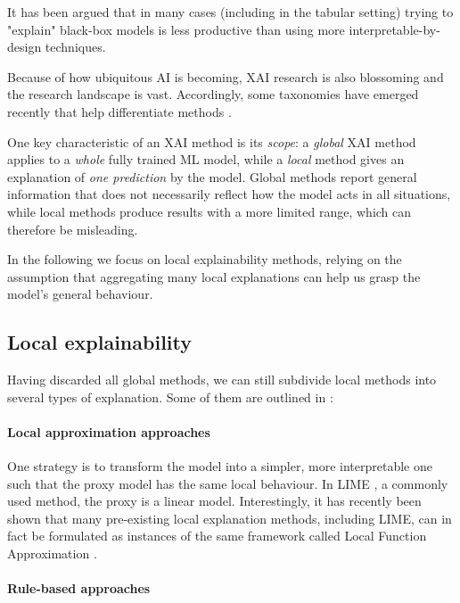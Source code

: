 \documentclass[../main.tex]{subfiles}
\begin{document}
It has been argued \cite{rudinWhy2019} that in many cases (including in the tabular setting) trying to "explain" black-box models is less productive than using more interpretable-by-design techniques.

Because of how ubiquitous AI is becoming, XAI research is also blossoming and the research landscape is vast.
Accordingly, some taxonomies have emerged recently that help differentiate methods \cite{zhangSurvey2021, bellePrinciples2021}.

One key characteristic of an XAI method is its \emph{scope}: a \emph{global} XAI method applies to a \emph{whole} fully trained ML model, while a \emph{local} method gives an explanation of \emph{one prediction} by the model.
Global methods report general information that does not necessarily reflect
how the model acts in all situations, while local methods produce results with
a more limited range, which can therefore be misleading.


In the following we focus on local explainability methods, relying on the assumption that aggregating many local explanations can help us grasp the model's general behaviour.

\subsection{Local explainability}

Having discarded all global methods, we can still subdivide local methods into several types of explanation. Some of them are outlined in \cite{bellePrinciples2021}:

\paragraph{Local approximation approaches}

One strategy is to transform the model into a simpler, more interpretable one such that the proxy model has the same local behaviour. In LIME \cite{ribeiroWhy2016}, a commonly used method, the proxy is a linear model.
Interestingly, it has recently been shown that many pre-existing local explanation methods, including LIME, can in fact be formulated as instances of the same framework called Local Function Approximation \cite{hanWhich2022}.

\paragraph{Rule-based approaches}
\end{document}
